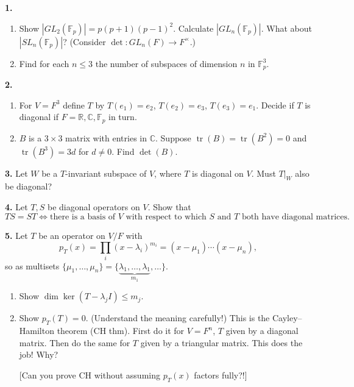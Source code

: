 \documentclass[11pt,a4paper]{article}
\newcommand{\F}{\mathbb{F}}
\newcommand{\prob}[1]{\textbf{#1}\quad}
\begin{document}
\prob{1.}
\begin{enumerate}[label=(\alph*),topsep=0pt]
\item Show $|GL_2(\F_p)| = p(p+1)(p-1)^2$. Calculate $|GL_n(\F_p)|$. What about $|SL_n(\F_p)|$? (Consider $\det\colon GL_n(F)\to F^\times$.)
\item Find for each $n\le 3$ the number of subspaces of dimension $n$ in $\F_p^3$.
\end{enumerate}

\prob{2.}
\begin{enumerate}[label=(\alph*),topsep=0pt]
\item For $V=F^3$ define $T$ by $T(e_1)=e_2$, $T(e_2)=e_3$, $T(e_3)=e_1$. Decide if $T$ is diagonal if $F=\mathbb{R},\mathbb{C},\F_p$ in turn.
\item $B$ is a $3\times3$ matrix with entries in $\mathbb{C}$. Suppose $\operatorname{tr}(B)=\operatorname{tr}(B^2)=0$ and $\operatorname{tr}(B^3)=3d$ for $d\ne0$. Find $\det(B)$.
\end{enumerate}

\prob{3.} Let $W$ be a $T$-invariant subspace of $V$, where $T$ is diagonal on $V$. Must $T|_W$ also be diagonal?

\prob{4.} Let $T,S$ be diagonal operators on $V$. Show that
\[ TS=ST \iff \text{there is a basis of $V$ with respect to which $S$ and $T$ both have diagonal matrices.}\]

\prob{5.} Let $T$ be an operator on $V/F$ with
\[ p_T(x)=\prod_i (x-\lambda_i)^{m_i} = (x-\mu_1)\cdots(x-\mu_n), \]
so as multisets $\{\mu_1,\dots,\mu_n\}=\{\underbrace{\lambda_1,\dots,\lambda_1}_{m_1},\dots\}$.
\begin{enumerate}[label=(\alph*),topsep=0pt]
\item Show $\dim\ker(T-\lambda_j I)\le m_j$.
\item Show $p_T(T)=0$. (Understand the meaning carefully!) This is the Cayley--Hamilton theorem (CH thm).
First do it for $V=F^n$, $T$ given by a diagonal matrix. Then do the same for $T$ given by a triangular matrix. This does the job! Why?

[Can you prove CH without assuming $p_T(x)$ factors fully?!]
\end{enumerate}
\end{document}
